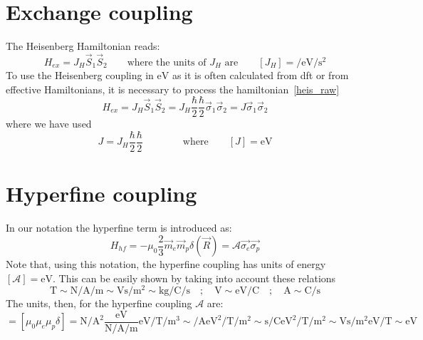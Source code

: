 \section{Exchange coupling}
The Heisenberg Hamiltonian reads:
\begin{equation}
  H_{ex} = J_H\vec{S}_1\vec{S}_2\qquad\text{where the units of $J_H$ are}\qquad
  [J_H]=\si{\per\eV\per\s\squared}
\label{heis_raw}
\end{equation}
To use the Heisenberg coupling in $\si{\eV}$ as it is often calculated from \ac{dft} or from effective Hamiltonians, it is necessary to process the hamiltonian~\eqref{heis_raw}
\begin{equation}
  H_{ex} = J_H\vec{S}_1\vec{S}_2 = J_H\frac{\hbar}{2}\frac{\hbar}{2}\vec{\sigma}_1\vec{\sigma}_2 =
  J\vec{\sigma}_1\vec{\sigma}_2
\end{equation}
where we have used
\begin{equation}
 J=J_H\frac{\hbar}{2}\frac{\hbar}{2}\qquad\qquad\text{where}\qquad [J]=\si{\eV}
\end{equation}


\section{Hyperfine coupling}
In our notation the hyperfine term is introduced as:
\begin{equation}
  H_{hf} = -\mu_0\frac{2}{3} \vec{m}_e\vec{m}_p\delta(\vec{R}) = \mathcal{A}\vec{\sigma_e}\vec{\sigma_p}
\end{equation}
Note that, using this notation, the hyperfine coupling has units of energy $[\mathcal{A}]=\si{\eV}$. This can be easily shown by taking into account these relations
\begin{equation}
  \si{\tesla} \sim
  \si{\newton\per\ampere\per\m}\sim\si{\volt\s\per\m\squared} \sim
  \si{\kilogram\per\coulomb\per\s}  \quad;\quad
  \si{\V}\sim\si{\eV\per\coulomb}  \quad;\quad
  \si{\ampere}\sim\si{\coulomb\per\s}
\end{equation}
The units, then, for the hyperfine coupling $\mathcal{A}$ are:
\begin{equation}
  [\mathcal{A}] = \left[\mu_0\mu_e\mu_p\delta\right] =
  \si{\newton\per\ampere\squared}\frac{\si{\eV}}{\si{\newton\per\ampere\per\m}}
  \si{\eV\per\tesla}\si{\per\m\cubed} \sim
  \si{\per\ampere}\si{\eV\squared\per\tesla}\si{\per\m\squared} \sim
  \si{\s\per\coulomb}\si{\eV\squared\per\tesla}\si{\per\m\squared} \sim
  \si{\V\s\per\m\squared}\si{\eV\per\tesla}\sim \si{\eV}
\end{equation}


